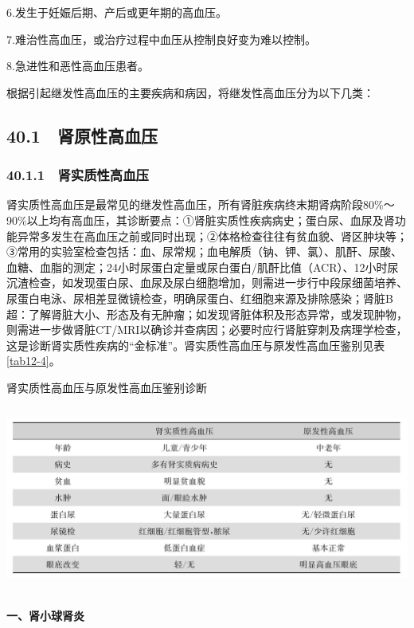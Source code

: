6.发生于妊娠后期、产后或更年期的高血压。

7.难治性高血压，或治疗过程中血压从控制良好变为难以控制。

8.急进性和恶性高血压患者。

根据引起继发性高血压的主要疾病和病因，将继发性高血压分为以下几类：

\subsection{40.1　肾原性高血压}

\subsubsection{40.1.1　肾实质性高血压}

肾实质性高血压是最常见的继发性高血压，所有肾脏疾病终末期肾病阶段80\%～90\%以上均有高血压，其诊断要点：①肾脏实质性疾病病史；蛋白尿、血尿及肾功能异常多发生在高血压之前或同时出现；②体格检查往往有贫血貌、肾区肿块等；③常用的实验室检查包括：血、尿常规；血电解质（钠、钾、氯）、肌酐、尿酸、血糖、血脂的测定；24小时尿蛋白定量或尿白蛋白/肌酐比值（ACR）、12小时尿沉渣检查，如发现蛋白尿、血尿及尿白细胞增加，则需进一步行中段尿细菌培养、尿蛋白电泳、尿相差显微镜检查，明确尿蛋白、红细胞来源及排除感染；肾脏B超：了解肾脏大小、形态及有无肿瘤；如发现肾脏体积及形态异常，或发现肿物，则需进一步做肾脏CT/MRI以确诊并查病因；必要时应行肾脏穿刺及病理学检查，这是诊断肾实质性疾病的“金标准”。肾实质性高血压与原发性高血压鉴别见表\ref{tab12-4}。

\begin{table}[htbp]
\centering
\caption{肾实质性高血压与原发性高血压鉴别诊断}
\label{tab12-4}
\includegraphics[width=6.03125in,height=2.375in]{./images/Image00086.jpg}
\end{table}

\paragraph{一、肾小球肾炎}

